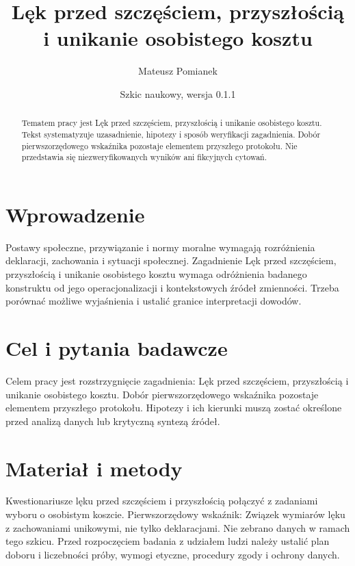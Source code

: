 \documentclass[11pt,a4paper]{article}
\title{Lęk przed szczęściem, przyszłością i unikanie osobistego kosztu}
\author{Mateusz Pomianek}
\date{Szkic naukowy, wersja 0.1.1}
\begin{document}
\maketitle

\begin{abstract}

Tematem pracy jest Lęk przed szczęściem, przyszłością i unikanie osobistego kosztu. Tekst systematyzuje uzasadnienie, hipotezy i sposób weryfikacji zagadnienia. Dobór pierwszorzędowego wskaźnika pozostaje elementem przyszłego protokołu. Nie przedstawia się niezweryfikowanych wyników ani fikcyjnych cytowań.

\end{abstract}

\section{Wprowadzenie}

Postawy społeczne, przywiązanie i normy moralne wymagają rozróżnienia deklaracji, zachowania i sytuacji społecznej. Zagadnienie Lęk przed szczęściem, przyszłością i unikanie osobistego kosztu wymaga odróżnienia badanego konstruktu od jego operacjonalizacji i kontekstowych źródeł zmienności. Trzeba porównać możliwe wyjaśnienia i ustalić granice interpretacji dowodów.

\section{Cel i pytania badawcze}

Celem pracy jest rozstrzygnięcie zagadnienia: Lęk przed szczęściem, przyszłością i unikanie osobistego kosztu. Dobór pierwszorzędowego wskaźnika pozostaje elementem przyszłego protokołu. Hipotezy i ich kierunki muszą zostać określone przed analizą danych lub krytyczną syntezą źródeł.

\section{Materiał i metody}

Kwestionariusze lęku przed szczęściem i przyszłością połączyć z zadaniami wyboru o osobistym koszcie. Pierwszorzędowy wskaźnik: Związek wymiarów lęku z zachowaniami unikowymi, nie tylko deklaracjami. Nie zebrano danych w ramach tego szkicu. Przed rozpoczęciem badania z udziałem ludzi należy ustalić plan doboru i liczebności próby, wymogi etyczne, procedury zgody i ochrony danych.
\end{document}
